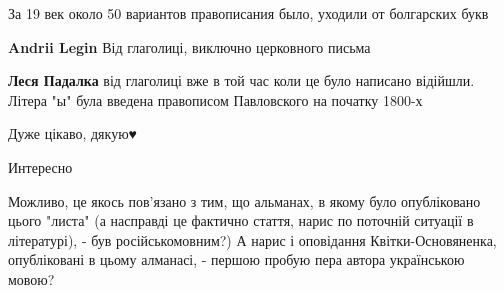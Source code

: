 \begin{itemize}
За 19 век около 50 вариантов правописания было, уходили от болгарских букв

\begin{itemize}
 
\textbf{Andrii Legin} Від глаголиці, виключно церковного письма

\begin{itemize}
 
\textbf{Леся Падалка} від глаголиці вже в той час коли це було написано відійшли. Літера "ы" була введена правописом Павловского на початку 1800-х
\end{itemize}
\end{itemize}

 
Дуже цікаво, дякую♥️


 
Интересно 🧐


 

Можливо, це якось пов'язано з тим, що альманах, в якому було опубліковано цього
"листа" (а насправді це фактично стаття, нарис по поточній ситуації в
літературі), - був російськомовним?) А нарис і оповідання Квітки-Основяненка,
опубліковані в цьому алманасі, - першою пробую пера автора українською мовою?


\end{itemize}
